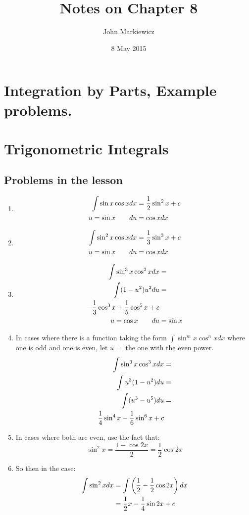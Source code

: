 \documentclass[11pt]{article}
\begin{document}
\title{Notes on Chapter 8}
\author{John Markiewicz}
\date{8 May 2015}
\maketitle
\section{Integration by Parts, Example problems.}

\section{Trigonometric Integrals}
\subsection{Problems in the lesson}
\begin{enumerate}
	\item 
		\begin{align}
			\setcounter{equation}{0}
				\int \sin x \cos x dx  &= \frac{1}{2}\sin ^2 x +c \\
				u = \sin x \qquad du &= \cos x dx
		\end{align}
	\item 
		\begin{align}
			\setcounter{equation}{0}
			\int \sin ^2 x \cos x dx &= \frac{1}{3}\sin ^3 x + c\\
			u = \sin x \qquad du &= \cos x dx
		\end{align}
	\item 
		\begin{align}
			\setcounter{equation}{0}
			\int \sin ^3 x \cos ^2 x dx &=  \\
			\int (1-u^2) u^2 du &= \\
			-\frac{1}{3} \cos ^3 x + \frac{1}{5} \cos ^5 x + c \\
			u = \cos x \qquad du &= \sin x
		\end{align}
	\item In cases where there is a function taking the form $\int \sin ^m x 
		\cos ^n x dx$ where one is odd and one is even, let $u =$ the one with the 
		even power.
		\begin{align}
			\setcounter{equation}{0}
			\int \sin ^3 x \cos ^3 x dx &= \\
			\int u^3(1-u^2)du &= \\
			\int (u^3-u^5) du &= \\
			\frac{1}{4} \sin ^4 x - \frac{1}{6}\sin ^6 x + c
		\end{align}
	\item In cases where both are even, use the fact that: \[
			\sin ^2 x = \frac{1-\cos 2x}{2} = \frac{1}{2}\cos 2x
		\]
	\item So then in the case:
		\begin{align}
			\setcounter{equation}{0}
			\int \sin ^2 x dx &= \int \left(\frac{1}{2} - \frac{1}{2}\cos 2x\right) dx \\
												&= \frac{1}{2}x - \frac{1}{4}\sin 2x +c
		\end{align}
\end{enumerate}
\end{document}
